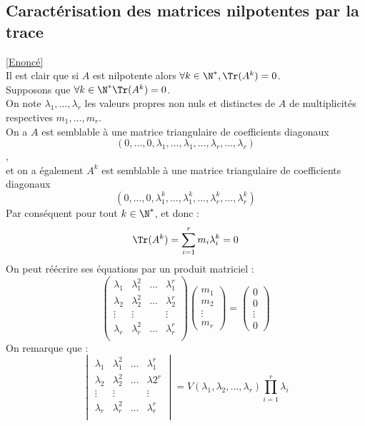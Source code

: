 \documentclass[8pt]{book}
\begin{document}
	\subsection{Caractérisation des matrices nilpotentes par la trace }
	\label{Caractérisation des matrices nilpotente par la trace corrigé}
	\textcolor{blue}{\hyperref[Caractérisation des matrices nilpotente par la trace]{[Enoncé]}}\\
	Il est clair que si $A$ est nilpotente alors $\forall k\in\N^*, \Tr(A^k)=0$.\\
	Supposons que $\forall k\in \N^* \Tr(A^k)=0$.\\
	On note $\lambda_1,\dots,\lambda_r$ les valeurs propres non nuls et distinctes de $A$ de multiplicités respectives $m_1,\dots, m_r$.\\
	On a $A$ est semblable à une matrice triangulaire de coefficients diagonaux $$(0,\dots,0,\lambda_1,\dots, \lambda_1,\dots,\lambda_r,\dots,\lambda_r)$$,\\
	et on a également $A^k$ est semblable à une matrice triangulaire de coefficients diagonaux $$(0,\dots,0,\lambda_1^k,\dots, \lambda_1^k,\dots,\lambda_r^k,\dots,\lambda_r^k)$$
	Par conséquent pour tout $k\in \N^*$, 
	et donc : \[\Tr(A^k)=\sum_{i=1}^rm_i\lambda_i^k=0\]
	On peut réécrire ses équations par un produit matriciel : 
	\[\begin{pmatrix}
		\lambda_1&\lambda_1^2&\dots&\lambda_1^r\\
		\lambda_2&\lambda_2^2&\dots&\lambda_2^r\\
		\vdots&\vdots&&\vdots\\
		\lambda_r&\lambda_r^2&\dots&\lambda_r^r\\
	\end{pmatrix}\begin{pmatrix}
	m_1\\m_2\\\vdots\\m_r
	\end{pmatrix}=\begin{pmatrix}
	0\\0\\ \vdots \\0
	\end{pmatrix}\]
	On remarque que : \[\begin{vmatrix}
		\lambda_1&\lambda_1^2&\dots&\lambda_1^r\\
		\lambda_2&\lambda_2^2&\dots&\lambda2^r\\
		\vdots&\vdots&&\vdots\\
		\lambda_r&\lambda_r^2&\dots&\lambda_r^r\\
	\end{vmatrix}= V(\lambda_1,\lambda_2,\dots,\lambda_r)\prod_{i=1}^{r}\lambda_i\]
\end{document}
